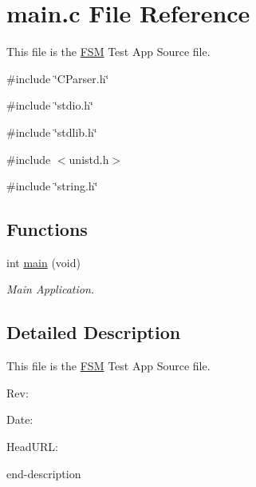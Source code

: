 \section{main.c File Reference}
\label{main_8c}


This file is the \hyperlink{struct_f_s_m}{FSM} Test App Source file.  


{\ttfamily \#include \char`\"{}CParser.h\char`\"{}}\par
{\ttfamily \#include \char`\"{}stdio.h\char`\"{}}\par
{\ttfamily \#include \char`\"{}stdlib.h\char`\"{}}\par
{\ttfamily \#include $<$unistd.h$>$}\par
{\ttfamily \#include \char`\"{}string.h\char`\"{}}\par
\subsection*{Functions}
\begin{DoxyCompactItemize}
\item 
int \hyperlink{group___a_p_p_ga840291bc02cba5474a4cb46a9b9566fe}{main} (void)
\begin{DoxyCompactList}\small\item\em Main Application. \end{DoxyCompactList}\end{DoxyCompactItemize}


\subsection{Detailed Description}
This file is the \hyperlink{struct_f_s_m}{FSM} Test App Source file. \begin{DoxyParagraph}{Rev:}

\end{DoxyParagraph}
\begin{DoxyParagraph}{Date:}

\end{DoxyParagraph}
\begin{DoxyParagraph}{HeadURL:}

\end{DoxyParagraph}


end-\/description 
